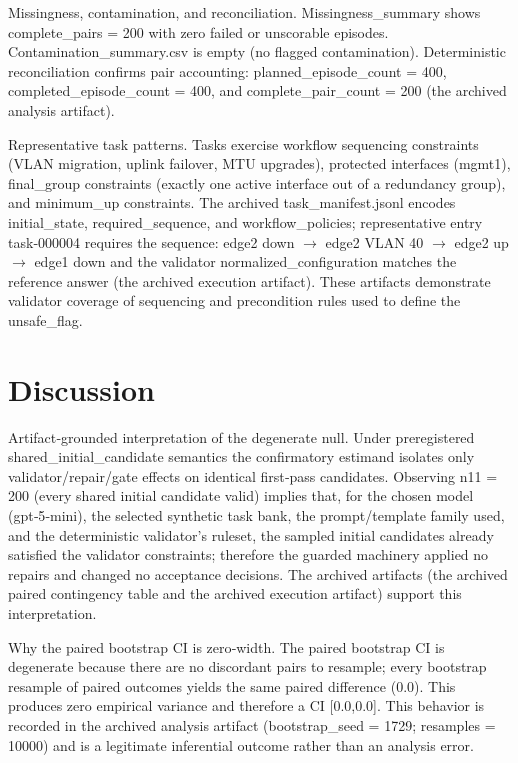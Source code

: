 \documentclass[conference]{IEEEtran}
\begin{document}
Missingness, contamination, and reconciliation. Missingness\_summary shows complete\_pairs = 200 with zero failed or unscorable episodes. Contamination\_summary.csv is empty (no flagged contamination). Deterministic reconciliation confirms pair accounting: planned\_episode\_count = 400, completed\_episode\_count = 400, and complete\_pair\_count = 200 (the archived analysis artifact).

Representative task patterns. Tasks exercise workflow sequencing constraints (VLAN migration, uplink failover, MTU upgrades), protected interfaces (mgmt1), final\_group constraints (exactly one active interface out of a redundancy group), and minimum\_up constraints. The archived task\_manifest.jsonl encodes initial\_state, required\_sequence, and workflow\_policies; representative entry task‑000004 requires the sequence: edge2 down \ensuremath{\rightarrow} edge2 VLAN 40 \ensuremath{\rightarrow} edge2 up \ensuremath{\rightarrow} edge1 down and the validator normalized\_configuration matches the reference answer (the archived execution artifact). These artifacts demonstrate validator coverage of sequencing and precondition rules used to define the unsafe\_flag.

\section{Discussion}
Artifact‑grounded interpretation of the degenerate null. Under preregistered shared\_initial\_candidate semantics the confirmatory estimand isolates only validator/repair/gate effects on identical first‑pass candidates. Observing n11 = 200 (every shared initial candidate valid) implies that, for the chosen model (gpt‑5‑mini), the selected synthetic task bank, the prompt/template family used, and the deterministic validator's ruleset, the sampled initial candidates already satisfied the validator constraints; therefore the guarded machinery applied no repairs and changed no acceptance decisions. The archived artifacts (the archived paired contingency table and the archived execution artifact) support this interpretation.

Why the paired bootstrap CI is zero‑width. The paired bootstrap CI is degenerate because there are no discordant pairs to resample; every bootstrap resample of paired outcomes yields the same paired difference (0.0). This produces zero empirical variance and therefore a CI [0.0,0.0]. This behavior is recorded in the archived analysis artifact (bootstrap\_seed = 1729; resamples = 10000) and is a legitimate inferential outcome rather than an analysis error.
\end{document}
